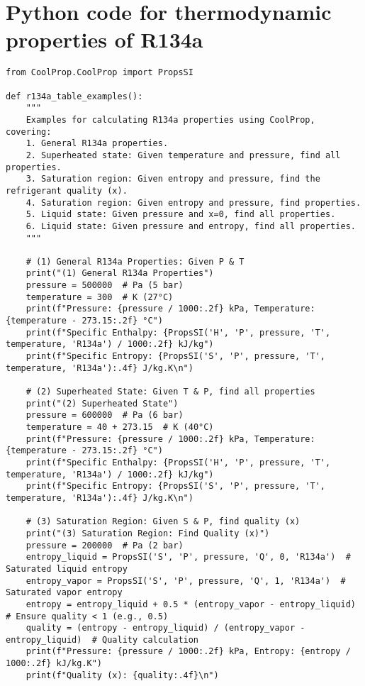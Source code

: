 \documentclass[11pt]{article}
\begin{document}
\section{Python code for thermodynamic properties of R134a}
\begin{lstlisting}[style=custompython, caption=Python code for thermodynamic properties of R134a]
    from CoolProp.CoolProp import PropsSI

def r134a_table_examples():
    """
    Examples for calculating R134a properties using CoolProp, covering:
    1. General R134a properties.
    2. Superheated state: Given temperature and pressure, find all properties.
    3. Saturation region: Given entropy and pressure, find the refrigerant quality (x).
    4. Saturation region: Given entropy and pressure, find properties.
    5. Liquid state: Given pressure and x=0, find all properties.
    6. Liquid state: Given pressure and entropy, find all properties.
    """

    # (1) General R134a Properties: Given P & T
    print("(1) General R134a Properties")
    pressure = 500000  # Pa (5 bar)
    temperature = 300  # K (27°C)
    print(f"Pressure: {pressure / 1000:.2f} kPa, Temperature: {temperature - 273.15:.2f} °C")
    print(f"Specific Enthalpy: {PropsSI('H', 'P', pressure, 'T', temperature, 'R134a') / 1000:.2f} kJ/kg")
    print(f"Specific Entropy: {PropsSI('S', 'P', pressure, 'T', temperature, 'R134a'):.4f} J/kg.K\n")

    # (2) Superheated State: Given T & P, find all properties
    print("(2) Superheated State")
    pressure = 600000  # Pa (6 bar)
    temperature = 40 + 273.15  # K (40°C)
    print(f"Pressure: {pressure / 1000:.2f} kPa, Temperature: {temperature - 273.15:.2f} °C")
    print(f"Specific Enthalpy: {PropsSI('H', 'P', pressure, 'T', temperature, 'R134a') / 1000:.2f} kJ/kg")
    print(f"Specific Entropy: {PropsSI('S', 'P', pressure, 'T', temperature, 'R134a'):.4f} J/kg.K\n")

    # (3) Saturation Region: Given S & P, find quality (x)
    print("(3) Saturation Region: Find Quality (x)")
    pressure = 200000  # Pa (2 bar)
    entropy_liquid = PropsSI('S', 'P', pressure, 'Q', 0, 'R134a')  # Saturated liquid entropy
    entropy_vapor = PropsSI('S', 'P', pressure, 'Q', 1, 'R134a')  # Saturated vapor entropy
    entropy = entropy_liquid + 0.5 * (entropy_vapor - entropy_liquid)  # Ensure quality < 1 (e.g., 0.5)
    quality = (entropy - entropy_liquid) / (entropy_vapor - entropy_liquid)  # Quality calculation
    print(f"Pressure: {pressure / 1000:.2f} kPa, Entropy: {entropy / 1000:.2f} kJ/kg.K")
    print(f"Quality (x): {quality:.4f}\n")


\end{lstlisting}
\end{document}
